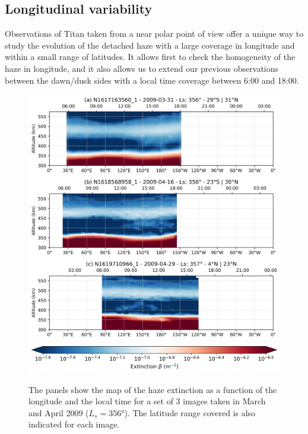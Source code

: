 \subsection{Longitudinal variability}

Observations of Titan taken from a near polar point of view offer a unique way to study the evolution of
the detached haze with a large coverage in longitude and within a small range of latitudes. It allows
first to check the homogeneity of the haze in longitude, and it also allows us to extend our previous
observations between the dawn/dusk sides with a local time coverage between 6:00 and 18:00.

\begin{figure}[!ht]
    \centering
    \includegraphics[width=.8\textwidth]{Fig/Lon_variability.png}
    \includegraphics[width=.5\textwidth]{Fig/Extinction_colorbar.png}\vspace{-.3cm}
    \caption{The panels show the map of the haze extinction as a function of the longitude and the local
    time for a set of 3 images taken in March and April 2009 ($L_s=\ang{356}$). The latitude range covered is
    also indicated for each image.}
    \label{fig:lon_variability}
\end{figure}

